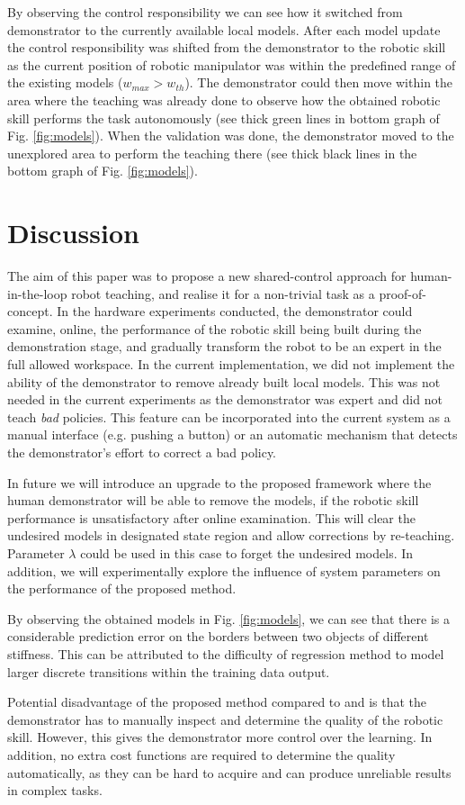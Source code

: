 By observing the control responsibility we can see how it switched from demonstrator to the currently available local models. After each model update the control responsibility was shifted from the demonstrator to the robotic skill as the current position of robotic manipulator was within the predefined range of the existing models ($w_{max}>w_{th}$). The demonstrator could then move within the area where the teaching was already done to observe how the obtained robotic skill performs the task autonomously (see thick green lines in bottom graph of Fig. \ref{fig:models}). When the validation was done, the demonstrator moved to the unexplored area to perform the teaching there (see thick black lines in the bottom graph of Fig. \ref{fig:models}).


\section{Discussion}
The aim of this paper was to propose a new shared-control approach for human-in-the-loop robot teaching, and realise it for a non-trivial task as a proof-of-concept. In the hardware experiments conducted, the demonstrator could examine, online, the performance of the robotic skill being built during the demonstration stage, and gradually transform the robot to be an expert in the full allowed workspace. In the current implementation, we did not implement the ability of the demonstrator to remove already built local models. This was not needed in the current experiments as the demonstrator was expert and did not teach {\it bad} policies. This feature can be incorporated into the current system as a manual interface (e.g. pushing a button) or an automatic mechanism that detects the demonstrator's effort to correct a bad policy.

In future we will introduce an upgrade to the proposed framework where the human demonstrator will be able to remove the models, if the robotic skill performance is unsatisfactory after online examination. This will clear the undesired models in designated state region and allow corrections by re-teaching. Parameter $\lambda$ could be used in this case to forget the undesired models. In addition, we will experimentally explore the influence of system parameters on the performance of the proposed method.

By observing the obtained models in Fig. \ref{fig:models}, we can see that there is a considerable prediction error on the borders between two objects of different stiffness. This can be attributed to the difficulty of regression method to model larger discrete transitions within the training data output.

Potential disadvantage of the proposed method compared to \cite{Peternel2013b} and \cite{Zamani2015} is that the demonstrator has to manually inspect and determine the quality of the robotic skill. However, this gives the demonstrator more control over the learning. In addition, no extra cost functions are required to determine the quality automatically, as they can be hard to acquire and can produce unreliable results in complex tasks.